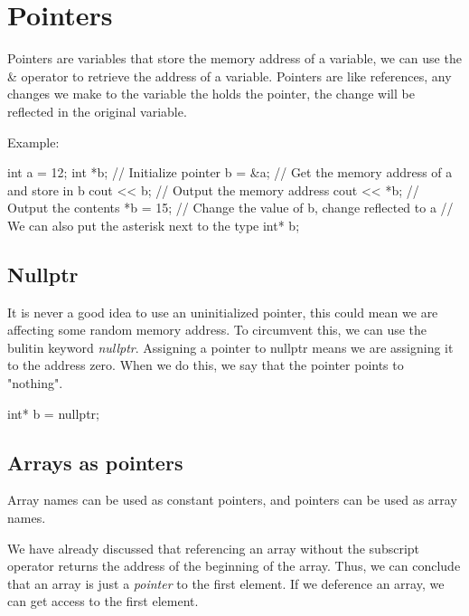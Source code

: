 \documentclass{report}
\begin{document}
    \pagebreak \bigbreak \noindent 
    \section{\LARGE Pointers}
    \bigbreak \noindent 
    \begin{concept}
 Pointers are variables that store the memory address of a variable, we can use the \& operator to retrieve the address of a variable. Pointers are like references, any changes we make to the variable the holds the pointer, the change will be reflected in the original variable.
	\end{concept}
    \bigbreak \noindent 
    \bigbreak \noindent 
    Example:
    \bigbreak \noindent 
    
    \begin{cppcode}
int a = 12;
int *b; // Initialize pointer  
b = &a; // Get the memory address of a and store in b
cout << b; // Output the memory address
cout << *b; // Output the contents
*b = 15; // Change the value of b, change reflected to a
// We can also put the asterisk next to the type
int* b;
    \end{cppcode}
    

    \bigbreak \noindent 
    \subsection{Nullptr}
    \bigbreak \noindent 
    It is never a good idea to use an uninitialized pointer, this could mean we are affecting some random memory address. To circumvent this, we can use the bulitin keyword \textit{nullptr}. Assigning a pointer to nullptr means we are assigning it to the address zero. When we do this, we say that the pointer points to "nothing".
    \bigbreak \noindent 
    
    \begin{cppcode}
int* b = nullptr;
    \end{cppcode}
    
    \bigbreak \noindent 

    \pagebreak\bigbreak \noindent 
    \subsection{Arrays as pointers}
    \bigbreak \noindent 
    \begin{concept}
 Array names can be used as constant pointers, and pointers can be used as array names.
	\end{concept}
    \bigbreak \noindent 
    We have already discussed that referencing an array without the subscript operator returns the address of the beginning of the array. Thus, we can conclude that an array is just a \textit{pointer} to the first element.
    \bigbreak \noindent 
    If we deference an array, we can get access to the first element.
    \bigbreak \noindent 
    
\end{document}
